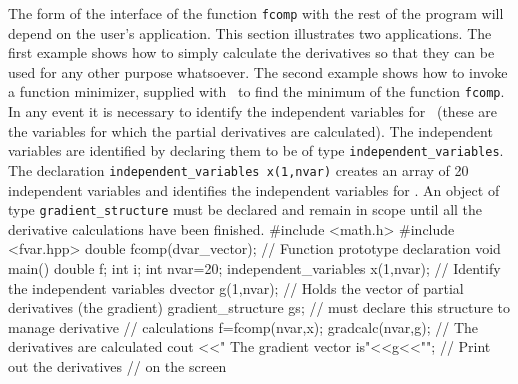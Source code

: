 \documentclass[12pt]{book}
\begin{document}
The form of the interface of the function {\tt fcomp}
with the rest of the program will depend on the user's 
application. This section illustrates two applications.
The first example shows how to simply calculate the derivatives so that they can
be used for any other purpose whatsoever. 
The second example shows how to invoke a function minimizer, supplied with
\AD\ to
find the minimum of the function {\tt fcomp}. 
In any event it is necessary 
to identify the independent variables for \AD\ (these are the variables
for which the partial derivatives are calculated). The 
independent variables are identified by declaring them to be of type
{\tt independent\_variables}. 
The declaration {\tt independent\_variables x(1,nvar)} 
creates an array of 20 independent variables and identifies the 
independent variables for \AD. An object of type {\tt gradient\_structure}
must be declared and remain in scope until all the derivative calculations
have been finished. 
\beginexample
#include <math.h>
#include <fvar.hpp>
double fcomp(dvar_vector); // Function prototype declaration
void main()
{
  double f;
  int i;
  int nvar=20;
  independent_variables x(1,nvar);  // Identify the independent variables
  dvector g(1,nvar);  // Holds the vector of partial derivatives (the gradient) 
  gradient_structure gs;    // must declare this structure to manage derivative
                            // calculations
  f=fcomp(nvar,x);
  gradcalc(nvar,g);        // The derivatives are calculated
  cout <<" The gradient vector is\n"<<g<<"\n"; // Print out the derivatives
}                                              // on the screen
\endexample

\end{document}
